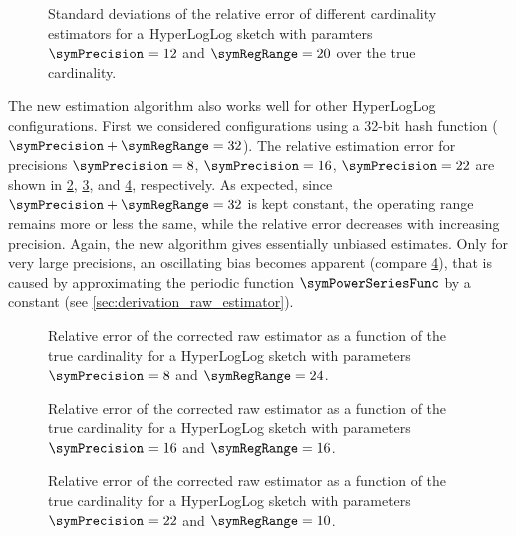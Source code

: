\documentclass[a4paper]{scrartcl}
\begin{document}
\begin{figure}
\centering

\caption{Standard deviations of the relative error of different cardinality estimators for a HyperLogLog sketch with paramters $\symPrecision = 12$ and $\symRegRange=20$ over the true cardinality.}
\label{fig:stdev_comparison}
\end{figure}

The new estimation algorithm also works well for other HyperLogLog configurations. First we considered configurations using a 32-bit hash function ($\symPrecision + \symRegRange = 32$). The relative estimation error for precisions $\symPrecision=8$, $\symPrecision=16$, $\symPrecision=22$ are shown in \cref{fig:raw_corrected_estimation_error_8_24}, \cref{fig:raw_corrected_estimation_error_16_16}, and \cref{fig:raw_corrected_estimation_error_22_10}, respectively. As expected, since  $\symPrecision + \symRegRange = 32$ is kept constant, the operating range remains more or less the same, while the relative error decreases with increasing precision. Again, the new algorithm gives essentially unbiased estimates. Only for very large precisions, an oscillating bias becomes apparent (compare \cref{fig:raw_corrected_estimation_error_22_10}), that is caused by approximating the periodic function $\symPowerSeriesFunc$ by a constant (see \cref{sec:derivation_raw_estimator}).

\begin{figure}
\centering

\caption{Relative error of the corrected raw estimator as a function of the true cardinality for a HyperLogLog sketch with parameters $\symPrecision = 8$ and $\symRegRange=24$.}
\label{fig:raw_corrected_estimation_error_8_24}
\end{figure}

\begin{figure}
\centering

\caption{Relative error of the corrected raw estimator as a function of the true cardinality for a HyperLogLog sketch with parameters $\symPrecision = 16$ and $\symRegRange=16$.}
\label{fig:raw_corrected_estimation_error_16_16}
\end{figure}

\begin{figure}
\centering

\caption{Relative error of the corrected raw estimator as a function of the true cardinality for a HyperLogLog sketch with parameters $\symPrecision = 22$ and $\symRegRange=10$.}
\label{fig:raw_corrected_estimation_error_22_10}
\end{figure}
\end{document}
